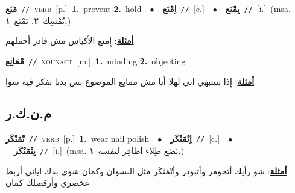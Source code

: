 \documentclass[10pt,a4paper,twoside]{article} %
\begin{document}
\begin{multicols}{2}
{\setlength\topsep{0pt}\textbf{\foreignlanguage{arabic}{مَنَع}}\ {\color{gray}\texttt{//}\color{black}}\ \textsc{verb}\ [p.]\ \textbf{1.}~prevent  \textbf{2.}~hold\ \ $\bullet$\ \ \setlength\topsep{0pt}\textbf{\foreignlanguage{arabic}{اِمْنَع}}\ {\color{gray}\texttt{//}\color{black}}\ [c.]\ \ $\bullet$\ \ \setlength\topsep{0pt}\textbf{\foreignlanguage{arabic}{يِمْنَع}}\ {\color{gray}\texttt{//}\color{black}}\ [i.]\ \color{gray}(msa. \foreignlanguage{arabic}{يُمْسِك}~\foreignlanguage{arabic}{\textbf{٢.}}  \foreignlanguage{arabic}{يَمْنَع}~\foreignlanguage{arabic}{\textbf{١.}})\color{black}\  \begin{flushright}\color{gray}\foreignlanguage{arabic}{\textbf{\underline{\foreignlanguage{arabic}{أمثلة}}}: إِمنع الأكياس مش قادر أحملهم}\end{flushright}\color{black}} \vspace{2mm}

{\setlength\topsep{0pt}\textbf{\foreignlanguage{arabic}{مْمَانِع}}\ {\color{gray}\texttt{//}\color{black}}\ \textsc{noun\textunderscore act}\ [m.]\ \textbf{1.}~minding  \textbf{2.}~objecting\  \begin{flushright}\color{gray}\foreignlanguage{arabic}{\textbf{\underline{\foreignlanguage{arabic}{أمثلة}}}: إِذا بتنتبهي اني لهلا أنا مش ممانِع الموضوع بس بدنا نفكر فيه سوا}\end{flushright}\color{black}} \vspace{2mm}

\vspace{-3mm}
\subsection*{\color{blue}\foreignlanguage{arabic}{م.ن.ك.ر}\color{blue}{}} 

{\setlength\topsep{0pt}\textbf{\foreignlanguage{arabic}{تْمَنْكَر}}\ {\color{gray}\texttt{//}\color{black}}\ \textsc{verb}\ [p.]\ \textbf{1.}~wear nail polish\ \ $\bullet$\ \ \setlength\topsep{0pt}\textbf{\foreignlanguage{arabic}{اِتْمَنْكَر}}\ {\color{gray}\texttt{//}\color{black}}\ [c.]\ \ $\bullet$\ \ \setlength\topsep{0pt}\textbf{\foreignlanguage{arabic}{يِتْمَنْكَر}}\ {\color{gray}\texttt{//}\color{black}}\ [i.]\ \color{gray}(msa. \foreignlanguage{arabic}{يَضَع طِلاء أظافِر لنفسه}~\foreignlanguage{arabic}{\textbf{١.}})\color{black}\  \begin{flushright}\color{gray}\foreignlanguage{arabic}{\textbf{\underline{\foreignlanguage{arabic}{أمثلة}}}: شو رأيك أتحومر وأتبودر وأتْمَنْكَر مثل النسوان وكمان شوي بدك اياني أربط عخصري وأرقصلك كمان}\end{flushright}\color{black}} \vspace{2mm}


\end{multicols}
\end{document}
